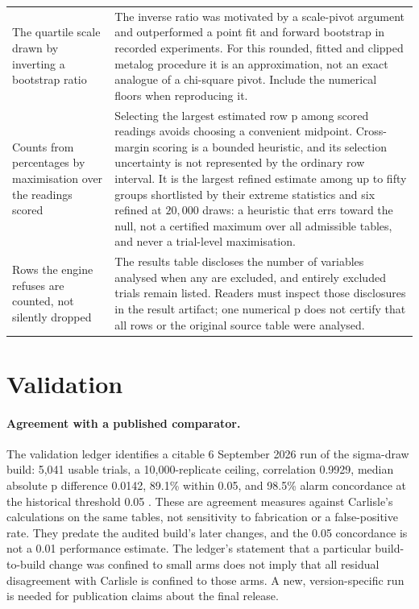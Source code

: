 \documentclass[11pt,a4paper]{article}
\begin{document}
\begin{longtable}{>{\raggedright\arraybackslash}p{} >{\raggedright\arraybackslash}p{}}
\addlinespace
The quartile scale drawn by inverting a bootstrap ratio &
The inverse ratio was motivated by a scale-pivot argument and outperformed a point fit and forward bootstrap in recorded experiments. For this rounded, fitted and clipped metalog procedure it is an approximation, not an exact analogue of a chi-square pivot. Include the numerical floors when reproducing it. \\
\addlinespace
Counts from percentages by maximisation over the readings scored &
Selecting the largest estimated row p among scored readings avoids choosing a convenient midpoint. Cross-margin scoring is a bounded heuristic, and its selection uncertainty is not represented by the ordinary row interval. It is the largest refined estimate among up to fifty groups shortlisted by their extreme statistics and six refined at $20{,}000$ draws: a heuristic that errs toward the null, not a certified maximum over all admissible tables, and never a trial-level maximisation. \\
\addlinespace
Rows the engine refuses are counted, not silently dropped &
The results table discloses the number of variables analysed when any are excluded, and entirely excluded trials remain listed. Readers must inspect those disclosures in the result artifact; one numerical p does not certify that all rows or the original source table were analysed. \\
\bottomrule
\end{longtable}

\section{Validation}
\label{sec:validation}

\paragraph{Agreement with a published comparator.} The validation ledger identifies a citable 6 September 2026 run of the sigma-draw build: 5,041 usable trials, a 10,000-replicate ceiling, correlation 0.9929, median absolute p difference 0.0142, 89.1\% within 0.05, and 98.5\% alarm concordance at the historical threshold 0.05 \citep{validationledger}. These are agreement measures against Carlisle's calculations on the same tables, not sensitivity to fabrication or a false-positive rate. They predate the audited build's later changes, and the 0.05 concordance is not a 0.01 performance estimate. The ledger's statement that a particular build-to-build change was confined to small arms does not imply that all residual disagreement with Carlisle is confined to those arms. A new, version-specific run is needed for publication claims about the final release.
\end{document}
